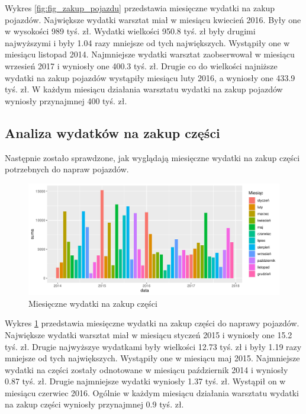 \documentclass{article}\usepackage[]{graphicx}\usepackage[]{xcolor}
\makeatletter
\def\maxwidth{ %
  \ifdim\Gin@nat@width>\linewidth
    \linewidth
  \else
    \Gin@nat@width
  \fi
}
\newenvironment{knitrout}{}{} %
\makeatother
\begin{document}
Wykres \ref{fig:fig_zakup_pojazdu} przedstawia miesięczne wydatki na zakup pojazdów. 
Największe wydatki warsztat miał w miesiącu kwiecień 2016. Były one w wysokości 989 tyś. zł. 
Wydatki wielkości 950.8 tyś. zł były drugimi najwyższymi i były 1.04 razy mniejsze od tych największych. Wystąpiły one w miesiącu listopad 2014.
Najmniejsze wydatki warsztat zaobserwował w miesiącu wrzesień 2017 i wyniosły one 400.3 tyś. zł. 
Drugie co do wielkości najniższe wydatki na zakup pojazdów wystąpiły miesiącu luty 2016, a wyniosły one 433.9 tyś. zł.
W każdym miesiącu działania warsztatu wydatki na zakup pojazdów wyniosły przynajmnej 400 tyś. zł.

\subsection{Analiza wydatków na zakup części}

Następnie zostało sprawdzone, jak wyglądają miesięczne wydatki na zakup części potrzebnych do napraw pojazdów.

\begin{knitrout}
\color{fgcolor}\begin{figure}[H]

{\centering \includegraphics[width=\maxwidth]{figure/fig_zakup_czesci-1} 

}

\caption[Miesięczne wydatki na zakup części]{Miesięczne wydatki na zakup części}\label{fig:fig_zakup_czesci}
\end{figure}

\end{knitrout}

Wykres \ref{fig:fig_zakup_czesci} przedstawia miesięczne wydatki na zakup części do naprawy pojazdów.
Największe wydatki warsztat miał w miesiącu styczeń 2015 i wyniosły one 15.2 tyś. zł. 
Drugie najwyższye wydatkami były wielkości 12.73 tyś. zł i były 1.19 razy mniejsze od tych największych. Wystąpiły one w miesiącu maj 2015.
Najmniejsze wydatki na części zostały odnotowane w miesiącu październik 2014 i wyniosły 0.87 tyś. zł. 
Drugie najmniejsze wydatki wyniosły 1.37 tyś. zł. Wystąpił on w miesiącu czerwiec 2016.
Ogólnie w każdym miesiącu działania warsztatu wydatki na zakup części wyniosły przynajmnej 0.9 tyś. zł.
\end{document}

